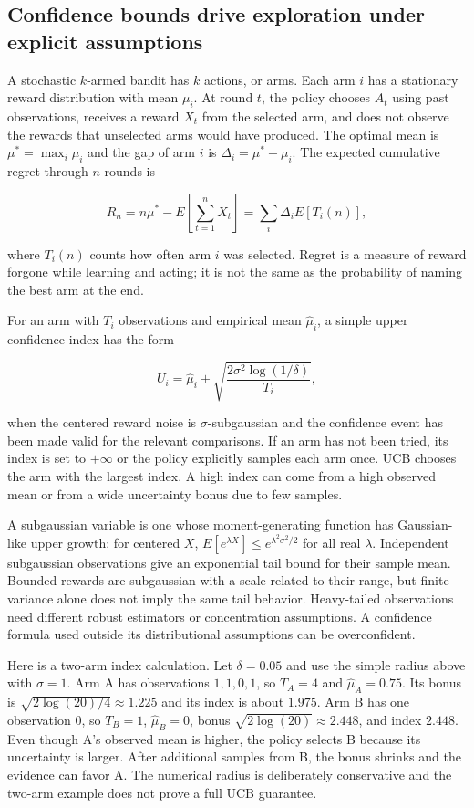 \subsection{Confidence bounds drive exploration under explicit assumptions}\label{03-visual-computing-i-ch012-confidence-bounds-drive-exploration-under-explicit-assumptions}

A stochastic \(k\)-armed bandit has \(k\) actions, or arms. Each arm \(i\) has a stationary reward distribution with mean \(\mu_i\). At round \(t\), the policy chooses \(A_t\) using past observations, receives a reward \(X_t\) from the selected arm, and does not observe the rewards that unselected arms would have produced. The optimal mean is \(\mu^*=\max_i\mu_i\) and the gap of arm \(i\) is \(\Delta_i=\mu^*-\mu_i\). The expected cumulative regret through \(n\) rounds is

\[
R_n=n\mu^*-E\left[\sum_{t=1}^n X_t\right]
=\sum_i\Delta_i E[T_i(n)],
\]

where \(T_i(n)\) counts how often arm \(i\) was selected. Regret is a measure of reward forgone while learning and acting; it is not the same as the probability of naming the best arm at the end.

For an arm with \(T_i\) observations and empirical mean \(\hat\mu_i\), a simple upper confidence index has the form

\[
U_i=\hat\mu_i+\sqrt{\frac{2\sigma^2\log(1/\delta)}{T_i}},
\]

when the centered reward noise is \(\sigma\)-subgaussian and the confidence event has been made valid for the relevant comparisons. If an arm has not been tried, its index is set to \(+\infty\) or the policy explicitly samples each arm once. UCB chooses the arm with the largest index. A high index can come from a high observed mean or from a wide uncertainty bonus due to few samples.

A subgaussian variable is one whose moment-generating function has Gaussian-like upper growth: for centered \(X\), \(E[e^{\lambda X}]\le e^{\lambda^2\sigma^2/2}\) for all real \(\lambda\). Independent subgaussian observations give an exponential tail bound for their sample mean. Bounded rewards are subgaussian with a scale related to their range, but finite variance alone does not imply the same tail behavior. Heavy-tailed observations need different robust estimators or concentration assumptions. A confidence formula used outside its distributional assumptions can be overconfident.

Here is a two-arm index calculation. Let \(\delta=0.05\) and use the simple radius above with \(\sigma=1\). Arm A has observations \(1,1,0,1\), so \(T_A=4\) and \(\hat\mu_A=0.75\). Its bonus is \(\sqrt{2\log(20)/4}\approx1.225\) and its index is about \(1.975\). Arm B has one observation \(0\), so \(T_B=1\), \(\hat\mu_B=0\), bonus \(\sqrt{2\log(20)}\approx2.448\), and index \(2.448\). Even though A's observed mean is higher, the policy selects B because its uncertainty is larger. After additional samples from B, the bonus shrinks and the evidence can favor A. The numerical radius is deliberately conservative and the two-arm example does not prove a full UCB guarantee.

